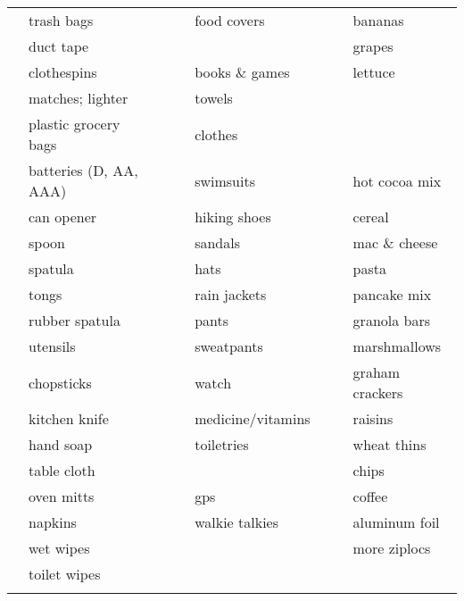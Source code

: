 \documentclass[10pt]{article}
\newcommand{\mybox}{\framebox[4mm]{\textcolor{white} m} \framebox[4mm]{\textcolor{white} m} }
\begin{document}
\begin{tabular}{rlcrlcrl}
\mybox & trash bags             &    &\mybox & food covers          &    &\mybox & bananas \\
\mybox & duct tape              &    &\mybox &                      &    &\mybox & grapes \\ \cline{4-5}
\mybox & clothespins            &    &\mybox & books \& games       &    &\mybox & lettuce \\
\mybox & matches; lighter       &    &\mybox & towels               &    &\mybox & \\
\mybox & plastic grocery bags   &    &\mybox & clothes              &    &\mybox & \\ \cline{7-8}
\mybox & batteries (D, AA, AAA) &    &\mybox & swimsuits            &    &\mybox & hot cocoa mix \\ \cline{1-2}
\mybox & can opener             &    &\mybox & hiking shoes         &    &\mybox & cereal \\
\mybox & spoon                  &    &\mybox & sandals              &    &\mybox & mac \& cheese \\
\mybox & spatula                &    &\mybox & hats                 &    &\mybox & pasta \\
\mybox & tongs                  &    &\mybox & rain jackets         &    &\mybox & pancake mix \\
\mybox & rubber spatula         &    &\mybox & pants                &    &\mybox & granola bars \\
\mybox & utensils               &    &\mybox & sweatpants           &    &\mybox & marshmallows \\
\mybox & chopsticks             &    &\mybox & watch                &    &\mybox & graham crackers \\
\mybox & kitchen knife          &    &\mybox & medicine/vitamins    &    &\mybox & raisins \\
\mybox & hand soap              &    &\mybox & toiletries           &    &\mybox & wheat thins \\
\mybox & table cloth            &    &\mybox &                      &    &\mybox & chips \\ \cline{4-5}
\mybox & oven mitts             &    &\mybox & gps                  &    &\mybox & coffee \\
\mybox & napkins                &    &\mybox & walkie talkies       &    &\mybox & aluminum foil \\
\mybox & wet wipes              &    &\mybox &                      &    &\mybox & more ziplocs \\
\mybox & toilet wipes           &    &\mybox &                      &    &\mybox & \\
\mybox & \hspace{1.5in}         &    &\mybox & \hspace{1.5in}       &    &\mybox & \hspace{1.5in} \\ \hline
\end{tabular}
\end{document}
